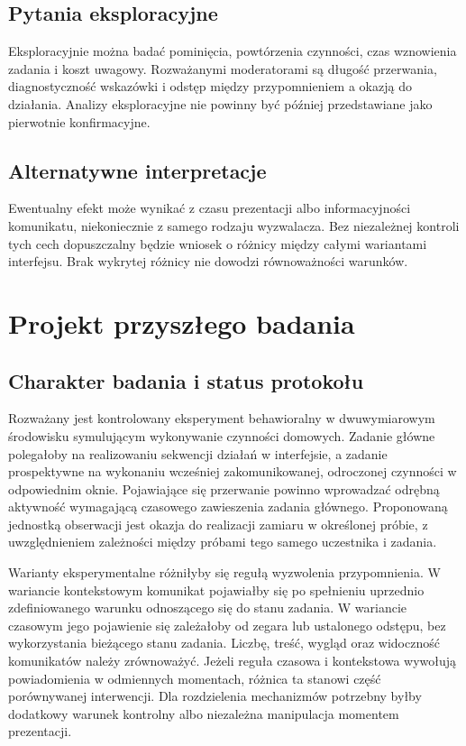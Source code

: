 \documentclass[11pt,a4paper]{article}
\begin{document}
\subsection{Pytania eksploracyjne}
Eksploracyjnie można badać pominięcia, powtórzenia czynności, czas wznowienia zadania i koszt uwagowy. Rozważanymi moderatorami są długość przerwania, diagnostyczność wskazówki i odstęp między przypomnieniem a okazją do działania. Analizy eksploracyjne nie powinny być później przedstawiane jako pierwotnie konfirmacyjne.

\subsection{Alternatywne interpretacje}
Ewentualny efekt może wynikać z czasu prezentacji albo informacyjności komunikatu, niekoniecznie z samego rodzaju wyzwalacza. Bez niezależnej kontroli tych cech dopuszczalny będzie wniosek o różnicy między całymi wariantami interfejsu. Brak wykrytej różnicy nie dowodzi równoważności warunków.

\section{Projekt przyszłego badania}
\subsection{Charakter badania i status protokołu}
Rozważany jest kontrolowany eksperyment behawioralny w dwuwymiarowym środowisku symulującym wykonywanie czynności domowych. Zadanie główne polegałoby na realizowaniu sekwencji działań w interfejsie, a zadanie prospektywne na wykonaniu wcześniej zakomunikowanej, odroczonej czynności w odpowiednim oknie. Pojawiające się przerwanie powinno wprowadzać odrębną aktywność wymagającą czasowego zawieszenia zadania głównego. Proponowaną jednostką obserwacji jest okazja do realizacji zamiaru w określonej próbie, z uwzględnieniem zależności między próbami tego samego uczestnika i zadania.

Warianty eksperymentalne różniłyby się regułą wyzwolenia przypomnienia. W wariancie kontekstowym komunikat pojawiałby się po spełnieniu uprzednio zdefiniowanego warunku odnoszącego się do stanu zadania. W wariancie czasowym jego pojawienie się zależałoby od zegara lub ustalonego odstępu, bez wykorzystania bieżącego stanu zadania. Liczbę, treść, wygląd oraz widoczność komunikatów należy zrównoważyć. Jeżeli reguła czasowa i kontekstowa wywołują powiadomienia w odmiennych momentach, różnica ta stanowi część porównywanej interwencji. Dla rozdzielenia mechanizmów potrzebny byłby dodatkowy warunek kontrolny albo niezależna manipulacja momentem prezentacji.
\end{document}
